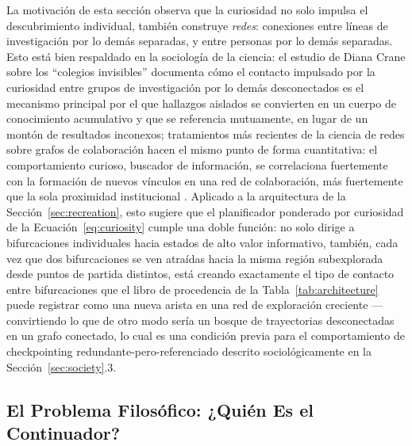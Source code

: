 \documentclass[11pt]{article}
\begin{document}
La motivación de esta sección observa que la curiosidad no solo impulsa el descubrimiento individual, también construye \emph{redes}: conexiones entre líneas de investigación por lo demás separadas, y entre personas por lo demás separadas. Esto está bien respaldado en la sociología de la ciencia: el estudio de Diana Crane sobre los ``colegios invisibles'' \citep{crane1972invisible} documenta cómo el contacto impulsado por la curiosidad entre grupos de investigación por lo demás desconectados es el mecanismo principal por el que hallazgos aislados se convierten en un cuerpo de conocimiento acumulativo y que se referencia mutuamente, en lugar de un montón de resultados inconexos; tratamientos más recientes de la ciencia de redes sobre grafos de colaboración hacen el mismo punto de forma cuantitativa: el comportamiento curioso, buscador de información, se correlaciona fuertemente con la formación de nuevos vínculos en una red de colaboración, más fuertemente que la sola proximidad institucional \citep{newman2001structure}. Aplicado a la arquitectura de la Sección~\ref{sec:recreation}, esto sugiere que el planificador ponderado por curiosidad de la Ecuación~\ref{eq:curiosity} cumple una doble función: no solo dirige a bifurcaciones individuales hacia estados de alto valor informativo, también, cada vez que dos bifurcaciones se ven atraídas hacia la misma región subexplorada desde puntos de partida distintos, está creando exactamente el tipo de contacto entre bifurcaciones que el libro de procedencia de la Tabla~\ref{tab:architecture} puede registrar como una nueva arista en una red de exploración creciente —convirtiendo lo que de otro modo sería un bosque de trayectorias desconectadas en un grafo conectado, lo cual es una condición previa para el comportamiento de checkpointing redundante-pero-referenciado descrito sociológicamente en la Sección~\ref{sec:society}.3.

\subsection{El Problema Filosófico: ¿Quién Es el Continuador?}
\end{document}
